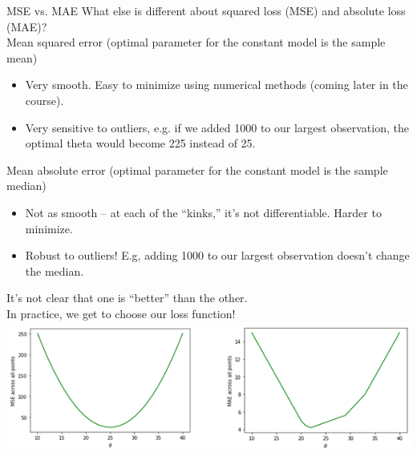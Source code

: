 \documentclass[aspectratio=169]{../latex_main/tntbeamer}  %
\begin{document}
	
	\begin{frame}{MSE vs. MAE}
	    What else is different about squared loss (MSE) and absolute loss (MAE)?\\
        Mean squared error (optimal parameter for the constant model is the sample mean)\\
        \begin{itemize}
            \item Very smooth. Easy to minimize using numerical methods (coming later in the course).
            \item Very sensitive to outliers, e.g. if we added 1000 to our largest observation, the optimal theta would become 225 instead of 25.
        \end{itemize}
        \bigskip
        Mean absolute error (optimal parameter for the constant model is the sample median)
        \begin{itemize}
            \item Not as smooth – at each of the “kinks,” it’s not differentiable. Harder to minimize.
            \item Robust to outliers! E.g, adding 1000 to our largest observation doesn’t change the median.
        \end{itemize}
        \bigskip
        It’s not clear that one is “better” than the other. \\
        In practice, we get to choose our loss function!\\
        
        \vspace{-7cm}
        \hspace{6cm} \includegraphics[scale=.33]{Bild46}\\
        \vspace{7cm}
	\end{frame}
	
\end{document}
